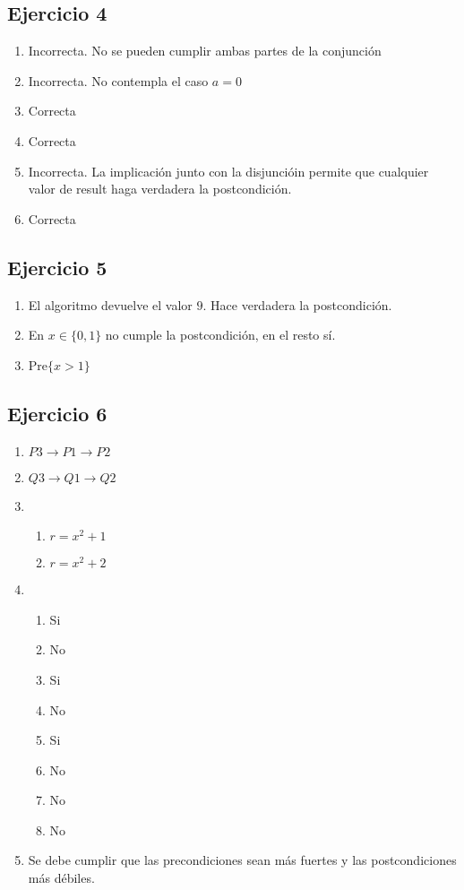 \subsection{Ejercicio 4}
\begin{enumerate}[label=(\alph*)]
    \item Incorrecta. No se pueden cumplir ambas partes de la conjunción
    \item Incorrecta. No contempla el caso $a = 0$
    \item Correcta
    \item Correcta
    \item Incorrecta. La implicación junto con la disjuncióin permite que cualquier valor de result haga verdadera la
    postcondición.
    \item Correcta    
\end{enumerate}

\subsection{Ejercicio 5}
\begin{enumerate}[label=(\alph*)]
    \item El algoritmo devuelve el valor $9$. Hace verdadera la postcondición.
    \item En $x \in \{0,1\}$ no cumple la postcondición, en el resto sí.
    \item Pre$\{ x > 1 \}$
\end{enumerate}

\subsection{Ejercicio 6}
\begin{enumerate}[label=(\alph*)]
    \item $P3 \rightarrow P1 \rightarrow P2$
    \item $Q3 \rightarrow Q1 \rightarrow Q2$
    \item \begin{enumerate}
        \item $r = x^2 + 1$
        \item $r = x^2 + 2$
    \end{enumerate}
    \item \begin{enumerate}
        \item Si
        \item No
        \item Si
        \item No
        \item Si
        \item No
        \item No
        \item No
    \end{enumerate}
    \item Se debe cumplir que las precondiciones sean más fuertes y las postcondiciones más débiles.
\end{enumerate}

